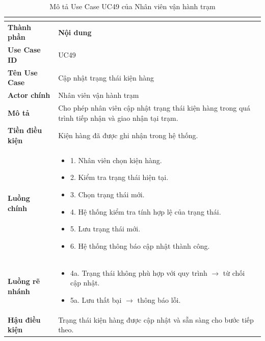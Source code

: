 \begin{longtable}{|C{3cm}|L{11cm}|}
\caption{Mô tả Use Case UC49 của Nhân viên vận hành trạm}\\
\label{tab:mo-ta-uc49-van-hanh-tram}\\
\hline
\textbf{Thành phần} & \textbf{Nội dung} \\
\hline
\textbf{Use Case ID} & UC49 \\
\hline
\textbf{Tên Use Case} & Cập nhật trạng thái kiện hàng \\
\hline
\textbf{Actor chính} & Nhân viên vận hành trạm \\
\hline
\textbf{Mô tả} &
Cho phép nhân viên cập nhật trạng thái kiện hàng trong quá trình tiếp nhận và giao nhận tại trạm.
\\
\hline
\textbf{Tiền điều kiện} &
Kiện hàng đã được ghi nhận trong hệ thống.
\\
\hline
\textbf{Luồng chính} &
\begin{itemize}[leftmargin=*,topsep=2pt,itemsep=2pt]
    \item 1. Nhân viên chọn kiện hàng.
    \item 2. Kiểm tra trạng thái hiện tại.
    \item 3. Chọn trạng thái mới.
    \item 4. Hệ thống kiểm tra tính hợp lệ của trạng thái.
    \item 5. Lưu trạng thái mới.
    \item 6. Hệ thống thông báo cập nhật thành công.
\end{itemize}
\\
\hline
\textbf{Luồng rẽ nhánh} &
\begin{itemize}[leftmargin=*,topsep=2pt,itemsep=2pt]
    \item 4a. Trạng thái không phù hợp với quy trình $\rightarrow$ từ chối cập nhật.
    \item 5a. Lưu thất bại $\rightarrow$ thông báo lỗi.
\end{itemize}
\\
\hline
\textbf{Hậu điều kiện} &
Trạng thái kiện hàng được cập nhật và sẵn sàng cho bước tiếp theo.
\\
\hline
\end{longtable}


